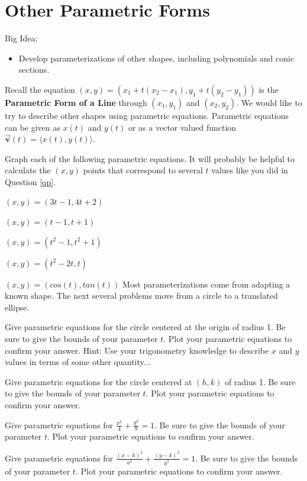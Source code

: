 \section{Other Parametric Forms}
Big Idea:
\begin{itemize}
\item Develop parameterizations of other shapes, including polynomials and conic sections.
\end{itemize}
\begin{info} Recall the equation $(x,y)=(x_1+t(x_2-x_1),y_1+t(y_2-y_1))$ is the \textbf{Parametric Form of a Line} through $(x_1,y_1)$ and $(x_2,y_2)$. We would like to try to describe other shapes using parametric equations. Parametric equations can be given as $x(t)$ and $y(t)$ or as a vector valued function $\vec{\textbf{v}}(t)= \langle x(t),y(t)\rangle$.
\end{info}
\bq Graph each of the following parametric equations. It will probably be helpful to calculate the $(x,y)$ points that correspond to several $t$ values like you did in Question \ref{qp}.
\be
\item $(x,y)=(3t-1,4t+2)$
\item $(x,y)=(t-1,t+1)$
\item $(x,y)=(t^2-1,t^2+1)$
\item $(x,y)=( t^2-2t,t)$
\item $(x,y)=(cos(t),tan(t))$
\ee
\eq
Most parameterizations come from adapting a known shape. The next several problems move from a circle to a translated ellipse.

\question Give parametric equations for the circle centered at the origin of radius 1. Be sure to give the bounds of your parameter $t$. Plot your parametric equations to confirm your answer. Hint: Use your trigonometry knowledge to describe $x$ and $y$ values in terms of some other quantity...

\question Give parametric equations for the circle centered at $(h,k)$ of radius 1. Be sure to give the bounds of your parameter $t$. Plot your parametric equations to confirm your answer.

\question Give parametric equations for $\frac{x^2}{4}+\frac{y^2}{9}=1$. Be sure to give the bounds of your parameter $t$. Plot your parametric equations to confirm your answer.

\question Give parametric equations for $\frac{(x-h)^2}{a^2}+\frac{(y-k)^2}{b^2}=1$. Be sure to give the bounds of your parameter $t$. Plot your parametric equations to confirm your answer.

